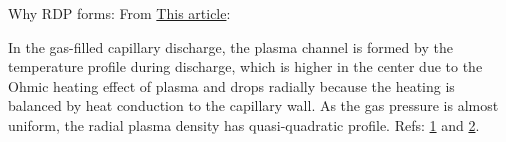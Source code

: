 \documentclass[../main.tex]{subfiles}
\begin{document}
Why RDP forms:
From \href{https://aip.scitation.org/doi/pdf/10.1063/1.5022817}{This article}:

In the gas-filled capillary discharge, the plasma channel is formed by the temperature profile during discharge, which is higher in the center due to the Ohmic heating effect of plasma and drops radially because the heating is balanced by heat conduction to the capillary wall. As the gas pressure is almost uniform, the radial plasma density has quasi-quadratic profile.
Refs: \href{https://journals.aps.org/pre/pdf/10.1103/PhysRevE.71.016401}{1} and \href{https://journals.aps.org/pre/pdf/10.1103/PhysRevE.65.016407}{2}.
\end{document}
